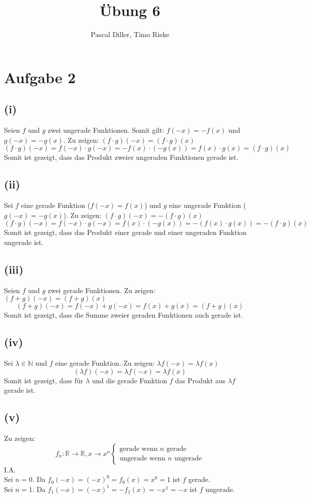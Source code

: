 \documentclass{article}
\title{Übung 6}
\author{Pascal Diller, Timo Rieke}
\begin{document}
\maketitle

\section{Aufgabe 2}
\subsection{(i)}
Seien $f$ und $g$ zwei ungerade Funktionen. Somit gilt: $f(-x) = -f(x)$ und $g(-x) = -g(x)$. Zu zeigen: $(f \cdot g)(-x) = (f \cdot g)(x)$
\[(f \cdot g)(-x) = f(-x) \cdot g(-x) = -f(x) \cdot (-g(x)) = f(x) \cdot g(x) = (f \cdot g)(x)\]
Somit ist gezeigt, dass das Produkt zweier ungeraden Funktionen gerade ist.

\subsection{(ii)}
Sei $f$ eine gerade Funktion ($f(-x)=f(x)$) und $g$ eine ungerade Funktion ($g(-x)=-g(x)$).
Zu zeigen: $(f \cdot g)(-x) = -(f \cdot g)(x)$
\[(f \cdot g)(-x) = f(-x) \cdot g(-x) = f(x) \cdot (-g(x)) = -(f(x) \cdot g(x)) = -(f \cdot g)(x)\]
Somit ist gezeigt, dass das Produkt einer gerade und einer ungeraden Funktion ungerade ist.

\subsection{(iii)}
Seien $f$ und $g$ zwei gerade Funktionen. Zu zeigen: $(f + g)(-x) = (f + g)(x)$
\[(f + g)(-x) = f(-x) + g(-x) = f(x) + g(x) = (f+g)(x)\]
Somit ist gezeigt, dass die Summe zweier geraden Funktionen auch gerade ist.

\subsection{(iv)}
Sei $\lambda \in \mathbb{N}$ und $f$ eine gerade Funktion. Zu zeigen: $\lambda f(-x) = \lambda f(x)$
\[(\lambda f)(-x) = \lambda f (-x) = \lambda f (x)\]
Somit ist gezeigt, dass für $\lambda$ und die gerade Funktion $f$ das Produkt aus $\lambda f$ gerade ist.

\subsection{(v)}
Zu zeigen: \[f_n: \mathbb{R} \to \mathbb{R}, x \to x^n \begin{cases}
    \text{gerade wenn } n \text{ gerade} \\
    \text{ungerade wenn } n \text{ ungerade}
\end{cases}\]
I.A. \\
Sei $n = 0$. Da $f_0(-x) = (-x)^0 = f_0(x) = x^0 = 1$ ist $f$ gerade. \\
\newline
Sei $n = 1$. Da $f_1(-x) = (-x)^1 = -f_1(x) = -x^1 = -x$ ist $f$ ungerade.
\end{document}
